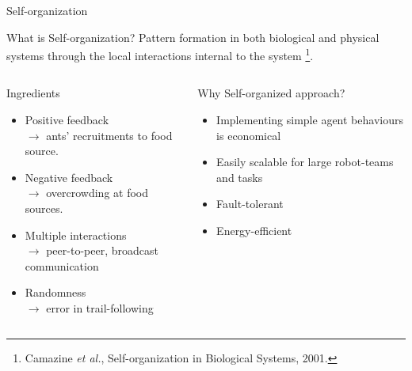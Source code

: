\documentclass{beamer}
\begin{document}
\begin{frame}[t]{Self-organization}
\begin{block}{What is Self-organization?}
\small \alert{Pattern formation} in both biological and physical systems through the local interactions internal to the system \footnote{\scriptsize Camazine \textit{et al.}, Self-organization in Biological Systems, 2001.}.%
\end{block}
\begin{columns}
%
\begin{block}{Ingredients}
\begin{itemize}
\item \small \alert{Positive feedback}\\
$\rightarrow$ \scriptsize ants' recruitments to food source.
\item \small \alert{Negative feedback}\\  
$\rightarrow$ \scriptsize overcrowding at food sources.
\item  \small \alert{Multiple interactions}\\ 
$\rightarrow$ \scriptsize peer-to-peer, broadcast communication
\item \small \alert{Randomness}\\
$\rightarrow$ \scriptsize error in trail-following
\end{itemize}
\end{block}
\begin{block}{Why Self-organized approach?}
\begin{itemize}
\item  \small Implementing simple agent behaviours is \alert{economical}%
\item  \small \alert{Easily scalable} for large robot-teams and tasks%
\item  \small \alert{Fault-tolerant}%
\item \small \alert{Energy-efficient}%
\end{itemize}
\end{block}
\end{columns}
\end{frame}
\end{document}

